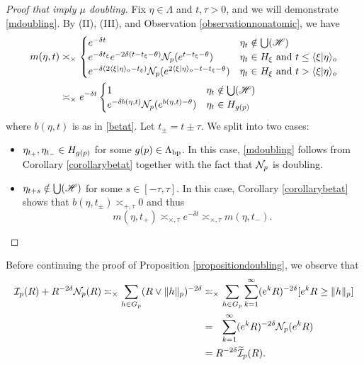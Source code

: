 \begin{proof}[Proof that  imply $\mu$ doubling]
Fix $\eta\in\Lambda$ and $t,\tau > 0$, and we will demonstrate \eqref{mdoubling}. By (II), (III), and Observation \ref{observationnonatomic}, we have
\begin{equation}
\label{GMFdoubling1}
\begin{split}
m(\eta,t) &\asymp_\times \begin{cases}
e^{-\delta t} & \eta_t\notin\bigcup(\mathscr H) \\
e^{-\delta t_\xi} e^{-2\delta(t - t_\xi - \theta)}\mathcal N_p(e^{t - t_\xi - \theta}) & \eta_t\in H_\xi \textup{ and }t \leq \langle \xi|\eta\rangle_o\\
e^{-\delta (2\langle \xi|\eta\rangle_o - t_\xi)} \mathcal N_p(e^{2\langle \xi|\eta\rangle_o - t - t_\xi - \theta}) & \eta_t\in H_\xi \textup{ and } t > \langle \xi|\eta\rangle_o
\end{cases}\\
&\asymp_\times e^{-\delta t} \begin{cases}
1 & \eta_t\notin\bigcup(\mathscr H)\\
e^{-\delta b(\eta,t)} \mathcal N_p(e^{b(\eta,t) - \theta}) & \eta_t \in H_{g(p)}
\end{cases}
\end{split}
\end{equation}
where $b(\eta,t)$ is as in \eqref{betat}. Let $t_\pm = t \pm \tau$. We split into two cases:
\begin{itemize}
\item[Case 1:] $\eta_{t_+},\eta_{t_-}\in H_{g(p)}$ for some $g(p)\in \Lambda_{\mathrm{bp}}$. In this case, \eqref{mdoubling} follows from Corollary \ref{corollarybetat} together with the fact that $\mathcal N_p$ is doubling.
\item[Case 2:] $\eta_{t + s}\notin \bigcup(\mathscr H)$ for some $s\in [-\tau,\tau]$. In this case, Corollary \ref{corollarybetat} shows that $b(\eta,t_\pm) \asymp_{\plus,\tau} 0$ and thus
\[
m(\eta,t_+) \asymp_{\times,\tau} e^{-\delta t} \asymp_{\times,\tau} m(\eta,t_-).
\]
\end{itemize}
\end{proof}
\noindent Before continuing the proof of Proposition \ref{propositiondoubling}, we observe that
\begin{equation*}
\begin{split}
\II_\bp(R) + R^{-2\delta}\NN_\bp(R) \asymp_\times \sum_{h\in G_\bp} (R\vee \|h\|_\bp)^{-2\delta}
&\asymp_\times \sum_{h\in G_\bp} \sum_{k = 1}^\infty (e^k R)^{-2\delta} [e^k R \geq \|h\|_\bp]\\
&=_\pt \sum_{k = 1}^\infty (e^k R)^{-2\delta} \NN_\bp(e^k R)\\
&= R^{-2\delta} \w\II_\bp(R).
\end{split}
\end{equation*}
